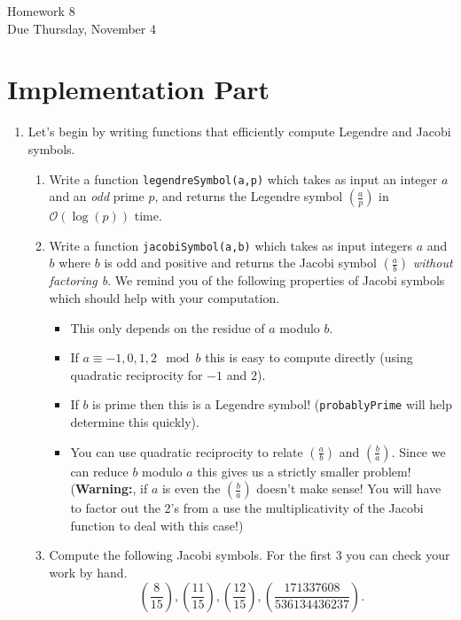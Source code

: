 \documentclass[11pt]{article}
\newcommand{\cO}{\mathcal{O}}
\begin{document}
\begin{center}
\Large {Homework 8}\\
\small {Due Thursday, November 4}
\end{center}
\section*{Implementation Part}
\begin{enumerate}
  \item{
  Let's begin by writing functions that efficiently compute Legendre and Jacobi symbols.
  \begin{enumerate}
    \item{
    Write a function \verb|legendreSymbol(a,p)| which takes as input an integer $a$ and an \textit{odd} prime $p$, and returns the Legendre symbol $\left(\frac{a}{p}\right)$ in $\cO(\log(p))$ time.
    }
    \item{
    Write a function \verb|jacobiSymbol(a,b)| which takes as input integers $a$ and $b$ where $b$ is odd and positive and returns the Jacobi symbol $\left(\frac{a}{b}\right)$ \textit{without factoring b}.  We remind you of the following properties of Jacobi symbols which should help with your computation.
    \begin{itemize}
      \item{
      This only depends on the residue of $a$ modulo $b$.
      }
      \item{
      If $a\equiv -1,0,1,2\mod b$ this is easy to compute directly (using quadratic reciprocity for $-1$ and $2$).
      }
      \item{
      If $b$ is prime then this is a Legendre symbol!  (\verb|probablyPrime| will help determine this quickly).
      }
      \item{
      You can use quadratic reciprocity to relate $\left(\frac{a}{b}\right)$ and $\left(\frac{b}{a}\right)$.  Since we can reduce $b$ modulo $a$ this gives us a strictly smaller problem!  (\textbf{Warning:}, if $a$ is even the $\left(\frac{b}{a}\right)$ doesn't make sense!  You will have to factor out the 2's from a use the multiplicativity of the Jacobi function to deal with this case!)
      }
    \end{itemize}
    }
    \item{
    Compute the following Jacobi symbols.  For the first 3 you can check your work by hand. \[\left(\frac{8}{15}\right),\left(\frac{11}{15}\right),\left(\frac{12}{15}\right),\left(\frac{171337608}{536134436237}\right).\]
    }
  \end{enumerate}
  }
\end{enumerate}
\end{document}
